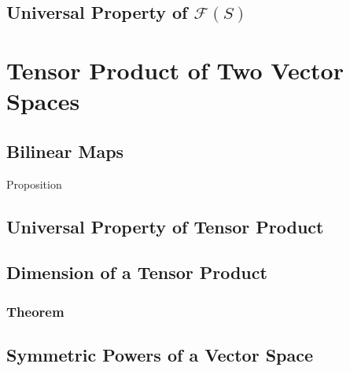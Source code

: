 \documentclass{article}
\begin{document}
\subsection{Universal Property of $\mathcal{F}(S)$ }
\section{Tensor Product of Two Vector Spaces }
\subsection{Bilinear Maps}
Proposition

\subsection{Universal Property of Tensor Product }

\subsection{Dimension of a Tensor Product}
\subsubsection{Theorem}

\subsection{Symmetric Powers of a Vector Space}
\end{document}
